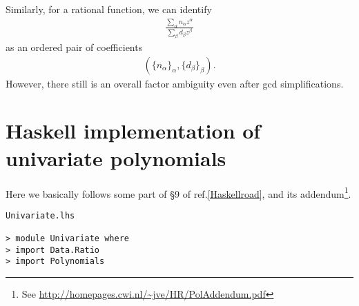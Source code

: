 \documentclass[11pt]{book}
\begin{document}
Similarly, for a rational function, we can identify
\begin{eqnarray}
\frac{\sum_\alpha n_\alpha z^\alpha}{\sum_\beta d_\beta z^\beta}
\end{eqnarray}
as an ordered pair of coefficients
\begin{eqnarray}
(\{ n_\alpha\}_\alpha, \{ d_\beta\}_\beta).
\end{eqnarray}
However, there still is an overall factor ambiguity even after gcd simplifications.

\section{Haskell implementation of univariate polynomials}
Here we basically follows some part of \S9 of ref.\ref{Haskellroad}, and its addendum\footnote{
See \url{http://homepages.cwi.nl/~jve/HR/PolAddendum.pdf}
}.

\begin{verbatim}
Univariate.lhs

> module Univariate where
> import Data.Ratio
> import Polynomials 
\end{verbatim}
\end{document}
